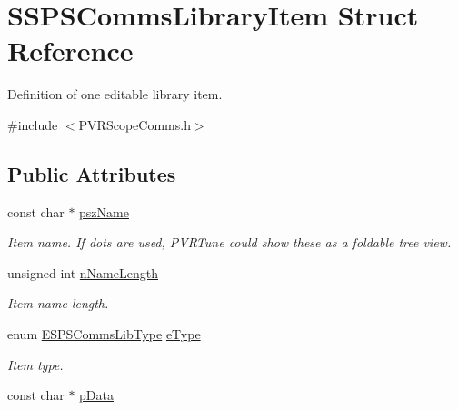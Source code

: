 \hypertarget{struct_s_s_p_s_comms_library_item}{\section{S\+S\+P\+S\+Comms\+Library\+Item Struct Reference}
\label{struct_s_s_p_s_comms_library_item}
}


Definition of one editable library item.  




{\ttfamily \#include $<$P\+V\+R\+Scope\+Comms.\+h$>$}

\subsection*{Public Attributes}
\begin{DoxyCompactItemize}
\item 
\hypertarget{struct_s_s_p_s_comms_library_item_aae73e38802aeacc2a5ad76046add3035}{const char $\ast$ \hyperlink{struct_s_s_p_s_comms_library_item_aae73e38802aeacc2a5ad76046add3035}{psz\+Name}}\label{struct_s_s_p_s_comms_library_item_aae73e38802aeacc2a5ad76046add3035}

\begin{DoxyCompactList}\small\item\em Item name. If dots are used, P\+V\+R\+Tune could show these as a foldable tree view. \end{DoxyCompactList}\item 
\hypertarget{struct_s_s_p_s_comms_library_item_a4a8652d81f838c749da2cdf68218f4f4}{unsigned int \hyperlink{struct_s_s_p_s_comms_library_item_a4a8652d81f838c749da2cdf68218f4f4}{n\+Name\+Length}}\label{struct_s_s_p_s_comms_library_item_a4a8652d81f838c749da2cdf68218f4f4}

\begin{DoxyCompactList}\small\item\em Item name length. \end{DoxyCompactList}\item 
\hypertarget{struct_s_s_p_s_comms_library_item_a6a3b350bcd56cc300369643cfb1dad23}{enum \hyperlink{group___scope_comms_ga3d928ff358bdf470a2c9881b13e4c1ff}{E\+S\+P\+S\+Comms\+Lib\+Type} \hyperlink{struct_s_s_p_s_comms_library_item_a6a3b350bcd56cc300369643cfb1dad23}{e\+Type}}\label{struct_s_s_p_s_comms_library_item_a6a3b350bcd56cc300369643cfb1dad23}

\begin{DoxyCompactList}\small\item\em Item type. \end{DoxyCompactList}\item 
\hypertarget{struct_s_s_p_s_comms_library_item_a7aac7ef93f7646ff97cbfecb44641574}{const char $\ast$ \hyperlink{struct_s_s_p_s_comms_library_item_a7aac7ef93f7646ff97cbfecb44641574}{p\+Data}}\label{struct_s_s_p_s_comms_library_item_a7aac7ef93f7646ff97cbfecb44641574}


\end{DoxyCompactItemize}
